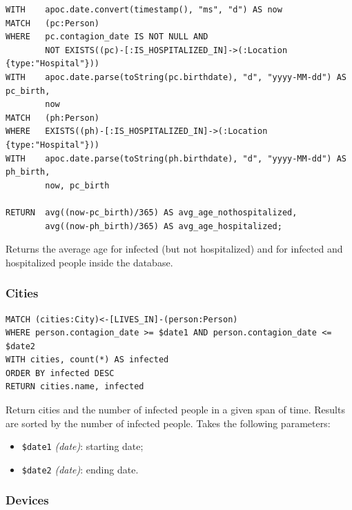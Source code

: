 \documentclass[12pt, a4paper]{article}
\begin{document}
\begin{tcolorbox}[fontupper=\scriptsize]
    \begin{verbatim}
WITH    apoc.date.convert(timestamp(), "ms", "d") AS now
MATCH   (pc:Person)
WHERE   pc.contagion_date IS NOT NULL AND
        NOT EXISTS((pc)-[:IS_HOSPITALIZED_IN]->(:Location {type:"Hospital"}))
WITH    apoc.date.parse(toString(pc.birthdate), "d", "yyyy-MM-dd") AS pc_birth,
        now
MATCH   (ph:Person)
WHERE   EXISTS((ph)-[:IS_HOSPITALIZED_IN]->(:Location {type:"Hospital"}))
WITH    apoc.date.parse(toString(ph.birthdate), "d", "yyyy-MM-dd") AS ph_birth,
        now, pc_birth

RETURN  avg((now-pc_birth)/365) AS avg_age_nothospitalized, 
        avg((now-ph_birth)/365) AS avg_age_hospitalized;
    \end{verbatim}
\end{tcolorbox}

\noindent %
Returns the average age for infected (but not hospitalized) and for infected 
and hospitalized people inside the database.

\subsubsection{Cities}

\begin{tcolorbox}[fontupper=\scriptsize]
    \begin{verbatim}
MATCH (cities:City)<-[LIVES_IN]-(person:Person) 
WHERE person.contagion_date >= $date1 AND person.contagion_date <= $date2
WITH cities, count(*) AS infected
ORDER BY infected DESC
RETURN cities.name, infected
    \end{verbatim}
\end{tcolorbox}

\noindent %
Return cities and the number of infected people in a given span of time. Results are sorted by the number of infected people. 
Takes the following parameters: 
\begin{itemize}
    \item \texttt{\$date1} \emph{(date)}: starting date;
    \item \texttt{\$date2} \emph{(date)}: ending date.
\end{itemize}

\subsubsection{Devices}
\end{document}
